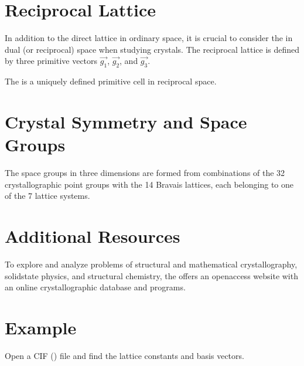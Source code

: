 \documentclass[letterpaper,10pt,english]{sphinxmanual}
\let\sphinxpxdimen\pdfpxdimen\else\newdimen\sphinxpxdimen
\begin{document}
\section{Reciprocal Lattice}
\label{\detokenize{crystal/crystal:reciprocal-lattice}}
\sphinxAtStartPar
In addition to the direct lattice in ordinary space, it is crucial to consider the  in dual (or reciprocal) space when studying crystals. The reciprocal lattice is defined by three primitive vectors \(\vec{g_1}\), \(\vec{g_2}\), and \(\vec{g_3}\).

\sphinxAtStartPar
The  is a uniquely defined primitive cell in reciprocal space.

\begin{figure}[htbp]
\centering

\noindent\sphinxincludegraphics[width=200\sphinxpxdimen]{{BZ}.png}
\end{figure}


\section{Crystal Symmetry and Space Groups}
\label{\detokenize{crystal/crystal:crystal-symmetry-and-space-groups}}
\sphinxAtStartPar
The space groups in three dimensions are formed from combinations of the 32 crystallographic point groups with the 14 Bravais lattices, each belonging to one of the 7 lattice systems.


\section{Additional Resources}
\label{\detokenize{crystal/crystal:additional-resources}}
\sphinxAtStartPar
To explore and analyze problems of structural and mathematical crystallography, solid\sphinxhyphen{}state physics, and structural chemistry, the  offers an open\sphinxhyphen{}access website with an online crystallographic database and programs.


\section{Example}
\label{\detokenize{crystal/crystal:example}}
\sphinxAtStartPar
Open a CIF () file and find the lattice constants and basis vectors.

\sphinxstepscope
\end{document}
